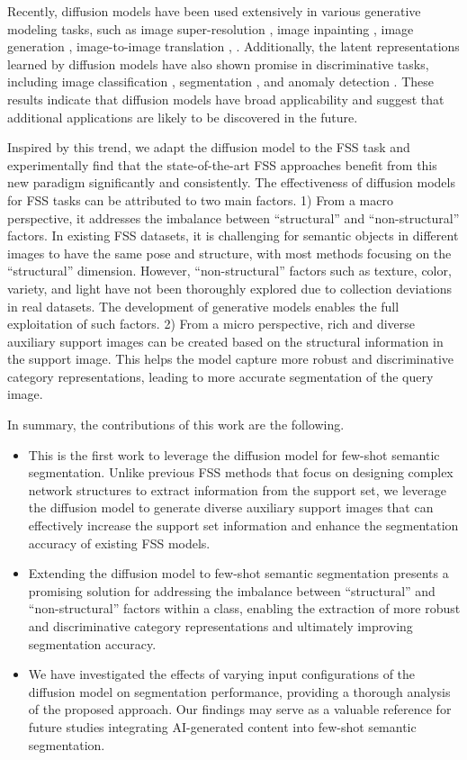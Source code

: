 \documentclass[sigconf]{acmart}
\begin{document}
Recently, diffusion models have been used extensively in various generative modeling tasks, such as image super-resolution \cite{rombach2022high}, image inpainting \cite{ho2020denoising,rombach2022high,saharia2022photorealistic}, image generation \cite{rombach2022text}, image-to-image translation \cite{choi2021ilvr}, . Additionally, the latent representations learned by diffusion models have also shown promise in discriminative tasks, including image classification \cite{zimmermann2021score}, segmentation \cite{baranchuk2021label}, and anomaly detection \cite{wyatt2022anoddpm}. These results indicate that diffusion models have broad applicability and suggest that additional applications are likely to be discovered in the future.

Inspired by this trend, we adapt the diffusion model to the FSS task and experimentally find that the state-of-the-art FSS approaches benefit from this new paradigm significantly and consistently. The effectiveness of diffusion models for FSS tasks can be attributed to two main factors. 1) From a macro perspective, it addresses the imbalance between ``structural'' and ``non-structural'' factors. In existing FSS datasets, it is challenging for semantic objects in different images to have the same pose and structure, with most methods focusing on the ``structural'' dimension. However, ``non-structural'' factors such as texture, color, variety, and light have not been thoroughly explored due to collection deviations in real datasets. The development of generative models enables the full exploitation of such factors. 2) From a micro perspective, rich and diverse auxiliary support images can be created based on the structural information in the support image. This helps the model capture more robust and discriminative category representations, leading to more accurate segmentation of the query image.


In summary, the contributions of this work are the following. 
\begin{itemize}
\item  This is the first work to leverage the diffusion model for few-shot semantic segmentation. Unlike previous FSS methods that focus on designing complex network structures to extract information from the support set, we leverage the diffusion model to generate diverse auxiliary support images that can effectively increase the support set information and enhance the segmentation accuracy of existing FSS models.
\item  Extending the diffusion model to few-shot semantic segmentation presents a promising solution for addressing the imbalance between ``structural'' and ``non-structural'' factors within a class, enabling the extraction of more robust and discriminative category representations and ultimately improving segmentation accuracy. 
\item  We have investigated the effects of varying input configurations of the diffusion model on segmentation performance, providing a thorough analysis of the proposed approach. Our findings may serve as a valuable reference for future studies integrating AI-generated content into few-shot semantic segmentation.
\end{itemize}
\end{document}

